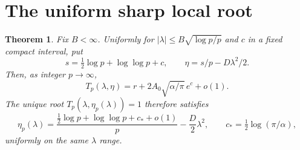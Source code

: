 \documentclass[11pt,letterpaper]{article}
\newtheorem{theorem}{Theorem}[section]
\theoremstyle{remark}\newtheorem{remark}[theorem]{Remark}
\numberwithin{equation}{section}
\begin{document}
\section{The uniform sharp local root}\label{ivd:sh:sec:localroot}
\begin{theorem}\label{ivd:sh:thm:localroot}
Fix $B<\infty$. Uniformly for
$|\lambda|\le B\sqrt{\log p/p}$ and $c$ in a fixed compact interval,
put
\[
 s=\tfrac12\log p+\log\log p+c,\qquad
 \eta=s/p-D\lambda^2/2.
\]
Then, as integer $p\to\infty$,
\begin{equation}\label{ivd:sh:eq:rowlimit}
 T_p(\lambda,\eta)=r+2A_0\sqrt{\alpha/\pi}\,e^c+o(1).
\end{equation}
The unique root $T_p(\lambda,\eta_p(\lambda))=1$ therefore satisfies
\begin{equation}\label{ivd:sh:eq:root}
 \eta_p(\lambda)=
 \frac{\frac12\log p+\log\log p+c_*+o(1)}p
  -\frac D2\lambda^2,
 \qquad c_*=\tfrac12\log(\pi/\alpha),
\end{equation}
uniformly on the same $\lambda$ range.
\end{theorem}
\end{document}
